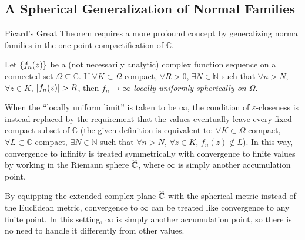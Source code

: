 \subsection{A Spherical Generalization of Normal Families}\label{sec:sphericalgeneralizationofnormalfamilies}
Picard's Great Theorem requires a more profound concept by generalizing normal families in the one-point compactification of \(\mathbb{C}\).
\begin{definition}
    Let \(\cbraces{f_n(z)}\) be a (not necessarily analytic) complex function sequence on a connected set \(\Omega\subseteq\mathbb{C}\). If \(\forall K\subset\Omega\) compact, \(\forall R>0\), \(\exists N\in\mathbb{N}\) such that \(\forall n>N\), \(\forall z\in K\), \(\abs{f_n(z)}>R\), then \textit{\(f_n\to\infty\) locally uniformly spherically on \(\Omega\)}.
\end{definition}
When the ``locally uniform limit'' is taken to be \(\infty\), the condition of \(\varepsilon\)-closeness is instead replaced by the requirement that the values eventually leave every fixed compact subset of \(\mathbb{C}\) (the given definition is equivalent to: \(\forall K\subset\Omega\) compact, \(\forall L\subset\mathbb{C}\) compact, \(\exists N\in\mathbb{N}\) such that \(\forall n>N\), \(\forall z\in K\), \(f_n(z)\notin L\)). In this way, convergence to infinity is treated symmetrically with convergence to finite values by working in the Riemann sphere \(\widehat{\mathbb{C}}\), where \(\infty\) is simply another accumulation point.

By equipping the extended complex plane \(\widehat{\mathbb{C}}\) with the spherical metric instead of the Euclidean metric, convergence to \(\infty\) can be treated like convergence to any finite point. In this setting, \(\infty\) is simply another accumulation point, so there is no need to handle it differently from other values.

